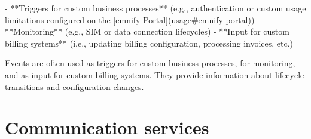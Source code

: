 \documentclass[11pt, oneside]{article}   	%
\newcommand{\addspace}{\vspace{2mm}}
\begin{document}
\addspace
\begin{markdown}
- **Triggers for custom business processes** (e.g., authentication or custom usage limitations configured on the [emnify Portal](usage#emnify-portal))
- **Monitoring** (e.g., SIM or data connection lifecycles)
- **Input for custom billing systems** (i.e., updating billing configuration, processing invoices, etc.)
\end{markdown}
\addspace
\begin{markdown}

Events are often used as triggers for custom business processes, for monitoring, and as input for custom billing systems.
They provide information about lifecycle transitions and configuration changes.

\end{markdown}
\pagebreak[4]
\section{Communication services}
\end{document}
